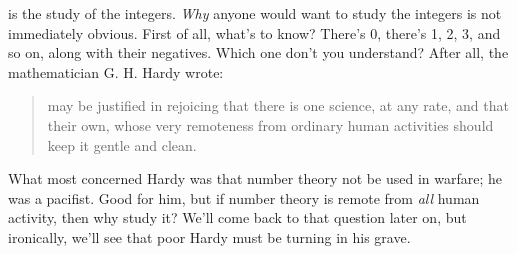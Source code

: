  is the study of the integers.  {\em Why} anyone would
want to study the integers is not immediately obvious.  First of all,
what's to know?  There's 0, there's 1, 2, 3, and so on, along with their
negatives.  Which one don't you understand?
After all, the mathematician G. H. Hardy wrote:
 \begin{quotation}
  may be justified in rejoicing that there
 is one science, at any rate, and that their own, whose very remoteness
 from ordinary human activities should keep it gentle and clean.
 \end{quotation}
What most concerned Hardy was that number theory not be used in
warfare; he was a pacifist.  Good for him, but if number theory is
remote from \textit{all} human activity, then why study it?
We'll come back to that question later on, but ironically, we'll see that
poor Hardy must be turning in his grave.

\endinput
